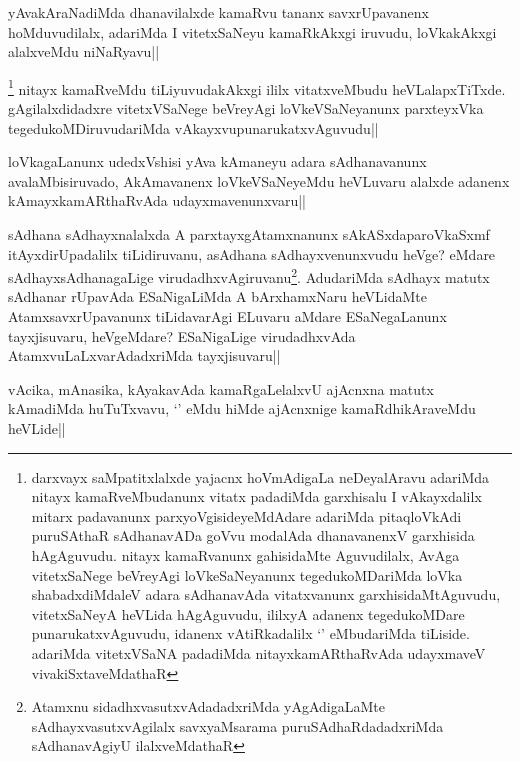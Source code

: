 \begin{artha}
yAvakAraNadiMda dhanavilalxde kamaRvu tananx savxrUpavanenx hoMduvudilalx, adariMda I vitetxSaNeyu kamaRkAkxgi iruvudu, loVkakAkxgi alalxveMdu niNaRyavu||
\end{artha}


\begin{artha}
\footnote[1]{darxvayx saMpatitxlalxde yajacnx hoVmAdigaLa neDeyalAravu adariMda nitayx kamaRveMbudanunx vitatx padadiMda garxhisalu I vAkayxdalilx mitarx padavanunx parxyoVgisideyeMdAdare adariMda pitaqloVkAdi puruSAthaR sAdhanavADa goVvu modalAda dhanavanenxV garxhisida hAgAguvudu. nitayx kamaRvanunx gahisidaMte Aguvudilalx, AvAga vitetxSaNege beVreyAgi loVkeSaNeyanunx tegedukoMDariMda loVka shabadxdiMdaleV adara sAdhanavAda vitatxvanunx garxhisidaMtAguvudu, vitetxSaNeyA heVLida hAgAguvudu, ililxyA adanenx tegedukoMDare punarukatxvAguvudu, idanenx vAtiRkadalilx `\stext ' eMbudariMda tiLiside. adariMda vitetxVSaNA padadiMda nitayxkamARthaRvAda udayxmaveV vivakiSxtaveMdathaR} nitayx kamaRveMdu tiLiyuvudakAkxgi ililx vitatxveMbudu heVLalapxTiTxde. gAgilalxdidadxre vitetxVSaNege beVreyAgi loVkeVSaNeyanunx parxteyxVka tegedukoMDiruvudariMda vAkayxvupunarukatxvAguvudu||
\end{artha}

\begin{artha}%
loVkagaLanunx udedxVshisi yAva kAmaneyu adara sAdhanavanunx avalaMbisiruvado, AkAmavanenx loVkeVSaNeyeMdu heVLuvaru alalxde adanenx kAmayxkamARthaRvAda udayxmavenunxvaru||
\end{artha}

\begin{artha}
sAdhana sAdhayxnalalxda A parxtayxgAtamxnanunx sAkASxdaparoVkaSxmf itAyxdirUpadalilx tiLidiruvanu, asAdhana sAdhayxvenunxvudu heVge? eMdare sAdhayxsAdhanagaLige virudadhxvAgiruvanu\footnote[1]{Atamxnu sidadhxvasutxvAdadadxriMda yAgAdigaLaMte sAdhayxvasutxvAgilalx savxyaMsarama puruSAdhaRdadadxriMda sAdhanavAgiyU ilalxveMdathaR}. AdudariMda sAdhayx matutx sAdhanar rUpavAda ESaNigaLiMda A bArxhamxNaru heVLidaMte AtamxsavxrUpavanunx tiLidavarAgi ELuvaru aMdare ESaNegaLanunx tayxjisuvaru, heVgeMdare? ESaNigaLige virudadhxvAda AtamxvuLaLxvarAdadxriMda tayxjisuvaru||
\end{artha}

\begin{artha}%
vAcika, mAnasika, kAyakavAda kamaRgaLelalxvU ajAcnxna matutx kAmadiMda huTuTxvavu, `\stext' eMdu hiMde ajAcnxnige kamaRdhikAraveMdu heVLide||
\end{artha}

